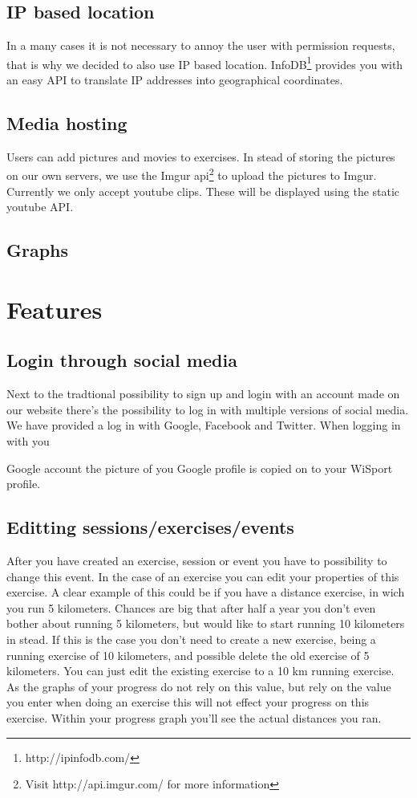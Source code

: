 \documentclass[11pt,a4paper]{scrartcl}
\begin{document}
\subsection{IP based location}
In a many cases it is not necessary to annoy the user with permission requests, that is why we decided to also use IP based location. InfoDB\footnote{http://ipinfodb.com/} provides you with an easy API to translate IP addresses into geographical coordinates.
\subsection{Media hosting}
Users can add pictures and movies to exercises. In stead of storing the pictures on our own servers, we use the Imgur api\footnote{Visit http://api.imgur.com/ for more information} to upload the pictures to Imgur. Currently we only accept youtube clips. These will be displayed using the static youtube API.
\subsection{Graphs}


\section{Features}
\subsection{Login through social media}
Next to the tradtional possibility to sign up and login with an account made on our
website there's the possibility to log in with multiple versions of social media. We
have provided a log in with Google, Facebook and Twitter. When logging in with you

Google account the picture of you Google profile is copied on to your WiSport profile.

\subsection{Editting sessions/exercises/events}
After you have created an exercise, session or event you have to possibility to change
this event. In the case of an exercise you can edit your properties of this exercise.
A clear example of this could be if you have a distance exercise, in wich you run 5
kilometers. Chances are big that after half a year you don't even bother about running
5 kilometers, but would like to start running 10 kilometers in stead. If this is the case
you don't need to create a new exercise, being a running exercise of 10 kilometers, and
possible delete the old exercise of 5 kilometers. You can just edit the existing exercise
to a 10 km running exercise. As the graphs of your progress do not rely on this value,
but rely on the value you enter when doing an exercise this will not effect your progress
on this exercise. Within your progress graph you'll see the actual distances you ran.
\end{document}
